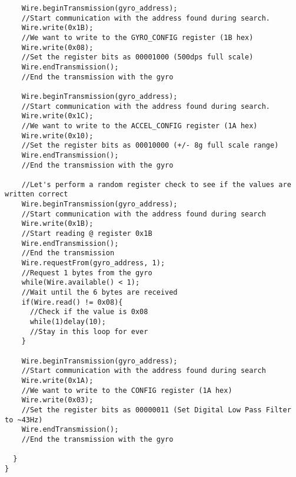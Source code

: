\begin{lstlisting}
    Wire.beginTransmission(gyro_address);                                      
    //Start communication with the address found during search.
    Wire.write(0x1B);                                                          
    //We want to write to the GYRO_CONFIG register (1B hex)
    Wire.write(0x08);                                                          
    //Set the register bits as 00001000 (500dps full scale)
    Wire.endTransmission();                                                    
    //End the transmission with the gyro

    Wire.beginTransmission(gyro_address);                                      
    //Start communication with the address found during search.
    Wire.write(0x1C);                                                          
    //We want to write to the ACCEL_CONFIG register (1A hex)
    Wire.write(0x10);                                                          
    //Set the register bits as 00010000 (+/- 8g full scale range)
    Wire.endTransmission();                                                    
    //End the transmission with the gyro

    //Let's perform a random register check to see if the values are written correct
    Wire.beginTransmission(gyro_address);                                      
    //Start communication with the address found during search
    Wire.write(0x1B);                                                          
    //Start reading @ register 0x1B
    Wire.endTransmission();                                                    
    //End the transmission
    Wire.requestFrom(gyro_address, 1);                                         
    //Request 1 bytes from the gyro
    while(Wire.available() < 1);                                               
    //Wait until the 6 bytes are received
    if(Wire.read() != 0x08){                                                   
      //Check if the value is 0x08
      while(1)delay(10);                                                       
      //Stay in this loop for ever
    }

    Wire.beginTransmission(gyro_address);                                      
    //Start communication with the address found during search
    Wire.write(0x1A);                                                          
    //We want to write to the CONFIG register (1A hex)
    Wire.write(0x03);                                                          
    //Set the register bits as 00000011 (Set Digital Low Pass Filter to ~43Hz)
    Wire.endTransmission();                                                    
    //End the transmission with the gyro    

  }  
}
\end{lstlisting}